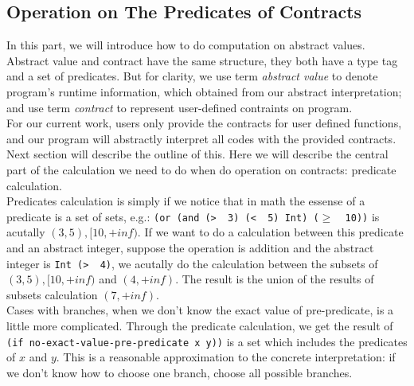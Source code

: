 \documentclass[paper=a4, fontsize=11pt]{scrartcl} %
\numberwithin{equation}{section} %
\numberwithin{figure}{section} %
\numberwithin{table}{section} %
\begin{document}
\subsection{Operation on The Predicates of Contracts}
In this part, we will introduce how to do computation on abstract values. Abstract value and contract have the same structure, they both have a type tag and a set of predicates. But for clarity, we use term \textit{abstract value} to denote program's runtime information, which obtained from our abstract interpretation; and use term \textit{contract} to represent user-defined contraints on program. \\

For our current work, users only provide the contracts for user defined functions, and our program will abstractly interpret all codes with the provided contracts. Next section will describe the outline of this. Here we will describe the central part of the calculation we need to do when do operation on contracts: predicate calculation. \\

Predicates calculation is simply if we notice that in math the essense of a predicate is a set of sets, e.g.: \texttt{(or (and (\textgreater\ \underscore\ 3) (\textless\ \underscore\ 5) Int) ($\geq$ \underscore\ 10))} is acutally ${(3, 5), [10, +inf)}$. If we want to do a calculation between this predicate and an abstract integer, suppose the operation is addition and the abstract integer is \texttt{Int (\textgreater\ \underscore\ 4)}, we acutally do the calculation between the subsets of ${(3, 5), [10, +inf)}$ and ${(4, +inf)}$. The result is the union of the results of subsets calculation ${(7, +inf)}$. \\

Cases with branches, when we don't know the exact value of pre-predicate, is a little more complicated. Through the predicate calculation, we get the result of \texttt{(if\ no-exact-value-pre-predicate\ x\ y))} is a set which includes the predicates of $x$ and $y$. This is a reasonable approximation to the concrete interpretation: if we don't know how to choose one branch, choose all possible branches. \\
\end{document}
